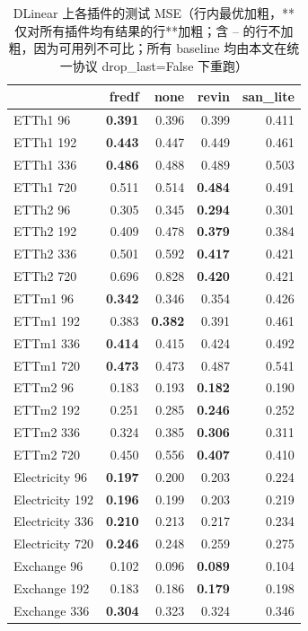 \begin{table}[htbp]
\centering
\small
\caption{DLinear 上各插件的测试 MSE（行内最优加粗，**仅对所有插件均有结果的行**加粗；含 -- 的行不加粗，因为可用列不可比；所有 baseline 均由本文在统一协议 drop\_last=False 下重跑）}
\label{tab:main_dlinear}
\begin{tabular}{lrrrr}
\toprule
 & fredf & none & revin & san\_lite \\
\midrule
ETTh1 96 & \textbf{0.391} & 0.396 & 0.399 & 0.411 \\
ETTh1 192 & \textbf{0.443} & 0.447 & 0.449 & 0.461 \\
ETTh1 336 & \textbf{0.486} & 0.488 & 0.489 & 0.503 \\
ETTh1 720 & 0.511 & 0.514 & \textbf{0.484} & 0.491 \\
ETTh2 96 & 0.305 & 0.345 & \textbf{0.294} & 0.301 \\
ETTh2 192 & 0.409 & 0.478 & \textbf{0.379} & 0.384 \\
ETTh2 336 & 0.501 & 0.592 & \textbf{0.417} & 0.421 \\
ETTh2 720 & 0.696 & 0.828 & \textbf{0.420} & 0.421 \\
ETTm1 96 & \textbf{0.342} & 0.346 & 0.354 & 0.426 \\
ETTm1 192 & 0.383 & \textbf{0.382} & 0.391 & 0.461 \\
ETTm1 336 & \textbf{0.414} & 0.415 & 0.424 & 0.492 \\
ETTm1 720 & \textbf{0.473} & 0.473 & 0.487 & 0.541 \\
ETTm2 96 & 0.183 & 0.193 & \textbf{0.182} & 0.190 \\
ETTm2 192 & 0.251 & 0.285 & \textbf{0.246} & 0.252 \\
ETTm2 336 & 0.324 & 0.385 & \textbf{0.306} & 0.311 \\
ETTm2 720 & 0.450 & 0.556 & \textbf{0.407} & 0.410 \\
Electricity 96 & \textbf{0.197} & 0.200 & 0.203 & 0.224 \\
Electricity 192 & \textbf{0.196} & 0.199 & 0.203 & 0.219 \\
Electricity 336 & \textbf{0.210} & 0.213 & 0.217 & 0.234 \\
Electricity 720 & \textbf{0.246} & 0.248 & 0.259 & 0.275 \\
Exchange 96 & 0.102 & 0.096 & \textbf{0.089} & 0.104 \\
Exchange 192 & 0.183 & 0.186 & \textbf{0.179} & 0.198 \\
Exchange 336 & \textbf{0.304} & 0.323 & 0.324 & 0.346 \\

\end{tabular}
\end{table}

